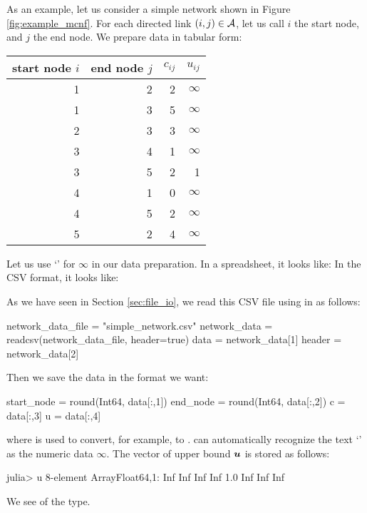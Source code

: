 As an example, let us consider a simple network shown in Figure \ref{fig:example_mcnf}. For each directed link $(i,j)\in\mathcal{A}$, let us call $i$ the start node, and $j$ the end node. We prepare data in tabular form:
\begin{center}
\begin{tabular}{|r|r|r|r|}
\hline
start node $i$ & end node $j$ &  $c_{ij}$ &     $u_{ij}$ \\
\hline
             1 &            2 &         2 &     $\infty$ \\
             1 &            3 &         5 &     $\infty$ \\
             2 &            3 &         3 &     $\infty$ \\
             3 &            4 &         1 &     $\infty$ \\
             3 &            5 &         2 &            1 \\
             4 &            1 &         0 &     $\infty$ \\
             4 &            5 &         2 &     $\infty$ \\
             5 &            2 &         4 &     $\infty$ \\
\hline
\end{tabular}
\end{center}
Let us use `' for $\infty$ in our data preparation. In a spreadsheet, it looks like:
In the CSV format, it looks like:
\begin{codelisting}
\end{codelisting}
As we have seen in Section \ref{sec:file_io}, we read this CSV file using  in \julia{} as follows:
\begin{code}
network_data_file = "simple_network.csv"
network_data = readcsv(network_data_file,  header=true)
data = network_data[1]
header = network_data[2]
\end{code}
Then we save the data in the format we want:
\begin{code}
start_node = round(Int64, data[:,1])
end_node = round(Int64, data[:,2])
c = data[:,3]
u = data[:,4]
\end{code}
\noindent where  is used to convert, for example,  to . \julia{} can automatically recognize the text `' as the numeric data $\infty$. The vector of upper bound $\boldsymbol{u}$ is stored as follows:
\begin{code}
julia> u
8-element Array{Float64,1}:
 Inf
 Inf
 Inf
 Inf
   1.0
 Inf
 Inf
 Inf
\end{code}
\noindent We see  of the  type.

